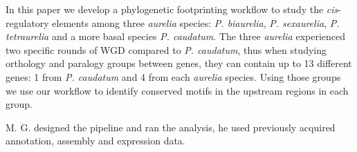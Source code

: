 In this paper we develop a phylogenetic footprinting workflow to study the \textit{cis}-regulatory elements among three \textit{aurelia} species: \textit{P. biaurelia}, \textit{P. sexaurelia}, \textit{P. tetraurelia} and a more basal species \textit{P. caudatum}. The three \textit{aurelia} experienced two specific rounds of WGD compared to \textit{P. caudatum}, thus when studying orthology and paralogy groups between genes, they can contain up to 13 different genes: 1 from \textit{P. caudatum} and 4 from each \textit{aurelia} species. Using those groups we use our workflow to identify conserved motifs in the upstream regions in each group.

M. G. designed the pipeline and ran the analysis, he used previously acquired annotation, assembly and expression data.

